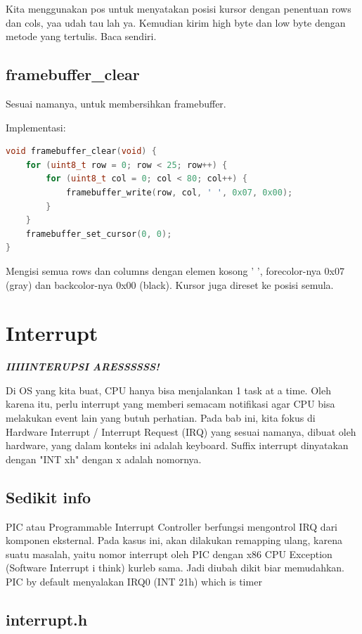 Kita menggunakan pos untuk menyatakan posisi kursor dengan penentuan rows dan cols, yaa udah tau lah ya. Kemudian kirim high byte dan low byte dengan metode yang tertulis. Baca sendiri.

\subsection{framebuffer\_clear}

Sesuai namanya, untuk membersihkan framebuffer.

Implementasi:

\begin{lstlisting}[language=c]
void framebuffer_clear(void) {
    for (uint8_t row = 0; row < 25; row++) {
        for (uint8_t col = 0; col < 80; col++) {
            framebuffer_write(row, col, ' ', 0x07, 0x00);
        }
    }
    framebuffer_set_cursor(0, 0);
}
\end{lstlisting}

Mengisi semua rows dan columns dengan elemen kosong ' ', forecolor-nya 0x07 (gray) dan backcolor-nya 0x00 (black). Kursor juga direset ke posisi semula.

\section{Interrupt}

\textit{\textbf{IIIIINTERUPSI ARESSSSSS!}}

Di OS yang kita buat, CPU hanya bisa menjalankan 1 task at a time. Oleh karena itu, perlu interrupt yang memberi semacam notifikasi agar CPU bisa melakukan event lain yang butuh perhatian. Pada bab ini, kita fokus di Hardware Interrupt / Interrupt Request (IRQ) yang sesuai namanya, dibuat oleh hardware, yang dalam konteks ini adalah keyboard. Suffix interrupt dinyatakan dengan "INT xh" dengan x adalah nomornya.

\subsection{Sedikit info}

PIC atau Programmable Interrupt Controller berfungsi mengontrol IRQ dari komponen eksternal. Pada kasus ini, akan dilakukan remapping ulang, karena suatu masalah, yaitu nomor interrupt oleh PIC dengan x86 CPU Exception (Software Interrupt i think) kurleb sama. Jadi diubah dikit biar memudahkan. PIC by default menyalakan IRQ0 (INT 21h) which is timer 

\subsection{interrupt.h}

